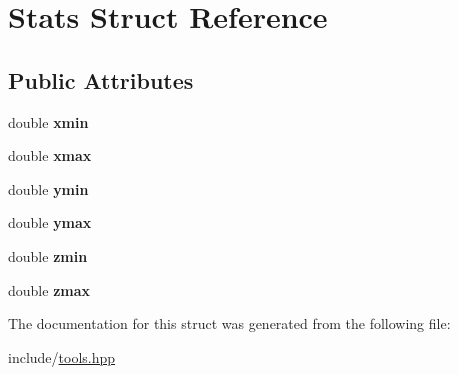 \hypertarget{structStats}{}\section{Stats Struct Reference}
\label{structStats}
\subsection*{Public Attributes}
\begin{DoxyCompactItemize}
\item 
\mbox{\label{structStats_a5ca5f37aa10d8f7ba2e36843fb0ff087}} 
double {\bfseries xmin}
\item 
\mbox{\label{structStats_a453fb9f3707d50ac85dea73f2e98d44e}} 
double {\bfseries xmax}
\item 
\mbox{\label{structStats_aa51866119dad6edc67ed2925c1d6621b}} 
double {\bfseries ymin}
\item 
\mbox{\label{structStats_aff5d2ce3b5c29036904553625efab0be}} 
double {\bfseries ymax}
\item 
\mbox{\label{structStats_a2b24842cc0de4a6be50dbb187bda7a6a}} 
double {\bfseries zmin}
\item 
\mbox{\label{structStats_a01151cacd95b1d847e69aa92796be82a}} 
double {\bfseries zmax}
\end{DoxyCompactItemize}


The documentation for this struct was generated from the following file\+:\begin{DoxyCompactItemize}
\item 
include/\hyperlink{tools_8hpp}{tools.\+hpp}\end{DoxyCompactItemize}

